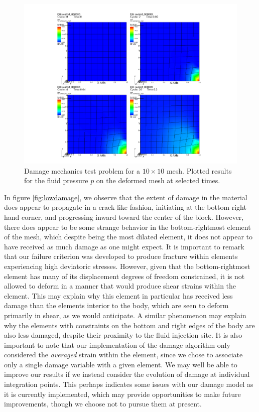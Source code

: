 \documentclass[11pt]{article} %
\begin{document}
\begin{figure} [!ht]
	\centering
	\includegraphics[width = 5.0in,trim=110 20 130 30,clip=true]{lowpressure.pdf}
	\caption{Damage mechanics test problem for a $10 \times 10$ mesh. Plotted results for the fluid pressure $p$ on the deformed mesh at selected times.}
	\label{fig:lowpressure}
\end{figure}

In figure \ref{fig:lowdamage}, we observe that the extent of damage in the material does appear to propagate in a crack-like fashion, initiating at the bottom-right hand corner, and progressing inward toward the center of the block. However, there does appear to be some strange behavior in the bottom-rightmost element of the mesh, which despite being the most dilated element, it does not appear to have received as much damage as one might expect. It is important to remark that our failure criterion was developed to produce fracture within elements experiencing high deviatoric stresses. However, given that the bottom-rightmost element has many of its displacement degrees of freedom constrained, it is not allowed to deform in a manner that would produce shear strains within the element. This may explain why this element in particular has received less damage than the elements interior to the body, which are seen to deform primarily in shear, as we would anticipate. A similar phenomenon may explain why the elements with constraints on the bottom and right edges of the body are also less damaged, despite their proximity to the fluid injection site. It is also important to note that our implementation of the damage algorithm only considered the \textit{averaged} strain within the element, since we chose to associate only a single damage variable with a given element. We may well be able to improve our results if we instead consider the evolution of damage at individual integration points. This perhaps indicates some issues with our damage model as it is currently implemented, which may provide opportunities to make future improvements, though we choose not to pursue them at present.
\end{document}
